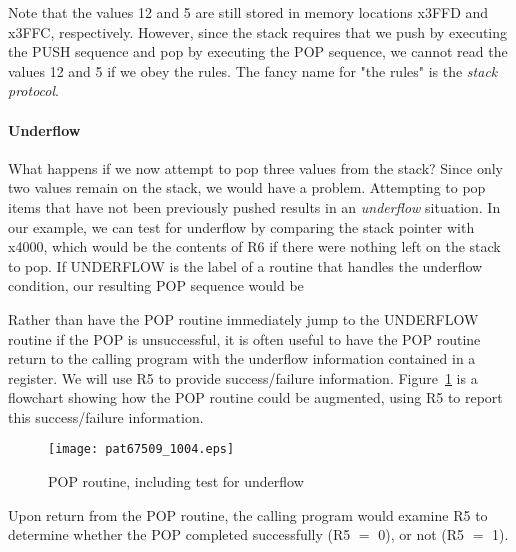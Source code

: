 \documentclass{patt}
\begin{document}
Note that the values 12 and 5 are still stored in
memory locations x3FFD and x3FFC, respectively.  However, since the
stack requires that we push by executing the PUSH sequence and pop by
executing the POP sequence, we cannot read the values 12 and 5 if we
obey the rules. The fancy name for "the rules" is the {\em stack
protocol}.  

\paragraph{Underflow}

What happens if we now attempt to pop three values from the stack?
Since only two values remain on the stack, we would have a problem.
Attempting to pop items that have not been previously pushed results
in an {\em underflow}  situation. In our example, we
can test for underflow by comparing the stack pointer with x4000,
which would be the contents of R6 if there were nothing left on the
stack to pop. If UNDERFLOW is the label of a routine that handles the
underflow condition, our resulting POP sequence would be


Rather than have the POP routine immediately jump to the UNDERFLOW
routine if the POP is unsuccessful, it is often useful to have the POP
routine return to the calling program with the underflow information
contained in a register.  We will use R5 to provide
success/failure information. Figure~\ref{fig:pop.flow.chart} is a
flowchart showing how the POP routine could be augmented, using R5 to
report this success/failure information.

\begin{figure}[h]
\centerline{\texttt{[image: pat67509\_1004.eps]}}
\caption{POP routine, including test for underflow}
\label{fig:pop.flow.chart}
\end{figure}

Upon return from the POP routine, the calling program would
examine R5 to determine whether the POP completed successfully (R5
$=$ 0), or not (R5 $=$ 1).
\end{document}

